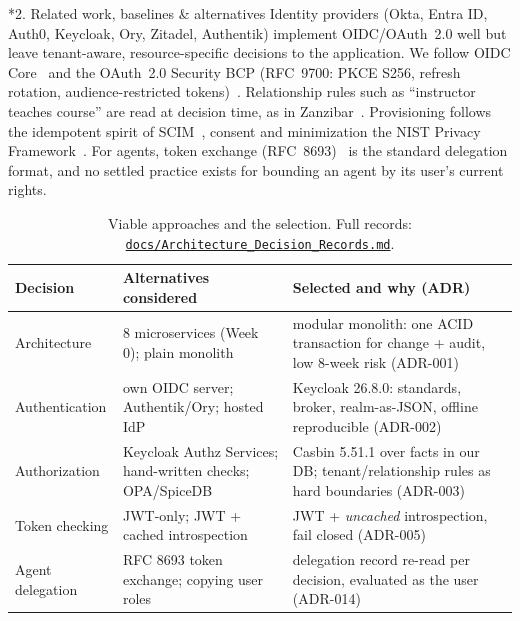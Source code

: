 \documentclass[11pt]{article}
\makeatletter
\newcommand{\code}[1]{\texttt{\small #1}}
\newcommand{\repo}{https://github.com/krishnateja2314/iam-provider}
\newcommand{\gh}[2]{\href{\repo/blob/cs5903-final-2026/#1}{#2}}
\renewcommand\section{\@startsection{section}{1}{0pt}{-10pt plus -2pt}{4pt}{\large\bfseries}}
\makeatother
\begin{document}
\section*{2. Related work, baselines \& alternatives}
Identity providers (Okta, Entra ID, Auth0, Keycloak, Ory, Zitadel, Authentik) implement OIDC/OAuth~2.0 well but leave tenant-aware, resource-specific decisions to the application. We follow OIDC Core~\cite{oidc} and the OAuth~2.0 Security BCP (RFC~9700: PKCE S256, refresh rotation, audience-restricted tokens)~\cite{bcp}. Relationship rules such as ``instructor teaches course'' are read at decision time, as in Zanzibar~\cite{zanzibar}. Provisioning follows the idempotent spirit of SCIM~\cite{scim}, consent and minimization the NIST Privacy Framework~\cite{nist}. For agents, token exchange (RFC~8693)~\cite{rfc8693} is the standard delegation format, and no settled practice exists for bounding an agent by its user's current rights.

\begin{table}[H]
\centering\small
\begin{tabularx}{\textwidth}{@{}P{3.2cm} P{4.6cm} L@{}}
\toprule
\textbf{Decision} & \textbf{Alternatives considered} & \textbf{Selected and why (ADR)}\\
\midrule
Architecture & 8 microservices (Week 0); plain monolith & modular monolith: one ACID transaction for change + audit, low 8-week risk (ADR-001)\\
Authentication & own OIDC server; Authentik/Ory; hosted IdP & Keycloak 26.8.0: standards, broker, realm-as-JSON, offline reproducible (ADR-002)\\
Authorization & Keycloak Authz Services; hand-written checks; OPA/SpiceDB & Casbin 5.51.1 over facts in our DB; tenant/relationship rules as hard boundaries (ADR-003)\\
Token checking & JWT-only; JWT + cached introspection & JWT + \emph{uncached} introspection, fail closed (ADR-005)\\
Agent delegation & RFC 8693 token exchange; copying user roles & delegation record re-read per decision, evaluated as the user (ADR-014)\\
\bottomrule
\end{tabularx}
\caption{Viable approaches and the selection. Full records: \gh{docs/Architecture_Decision_Records.md}{\code{docs/Architecture\_Decision\_Records.md}}.}
\end{table}
\end{document}
